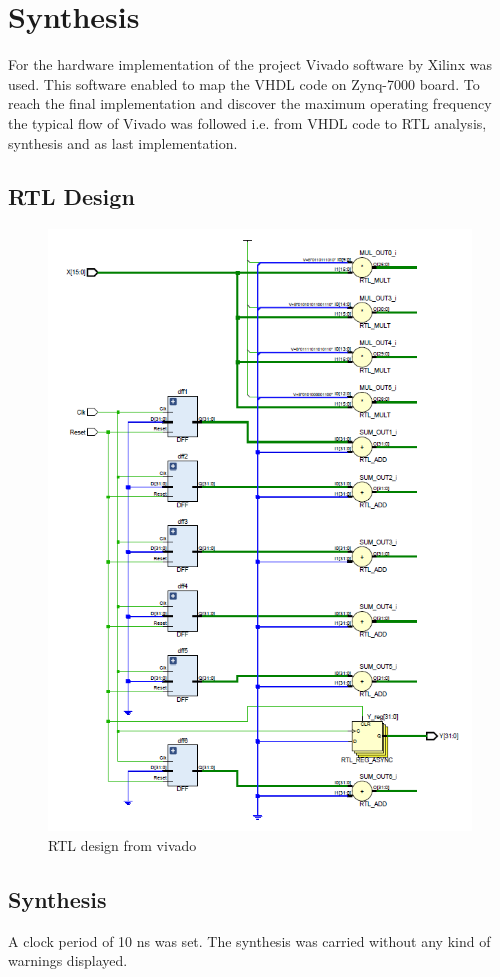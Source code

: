 \section{Synthesis} %
For the hardware implementation of the project Vivado software by Xilinx was used. This software enabled to map the VHDL code on Zynq-7000 board. To reach the final implementation and discover the maximum operating frequency the typical flow of Vivado was followed i.e. from VHDL code to RTL analysis, synthesis and as last implementation.
\label{sec:synthesis_and_implementation}
\subsection{RTL Design}
\begin{figure}[H]
  \centering
  \includegraphics[width=0.9\linewidth]{./images/schematic.PNG}
  \caption{RTL design from vivado}
  \label{fig:schematic}
\end{figure}
\subsection{Synthesis}
A clock period of 10 ns was set. The synthesis was carried without any kind of warnings displayed.\\

